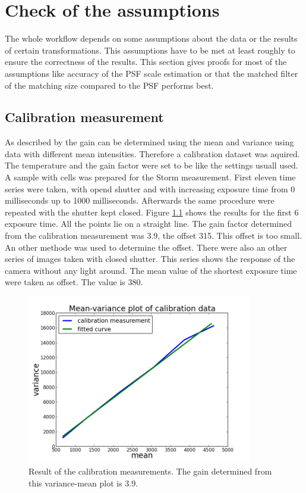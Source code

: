 \chapter{Check of the assumptions}
The whole workflow depends on some assumptions about the data or the results of certain transformations. This assumptions have to be met at least roughly to ensure the correctness of the results.\newline
This section gives proofs for most of the assumptions like accuracy of the PSF scale estimation or that the matched filter of the matching size compared to the PSF performs best.
\section{Calibration measurement}
As described by \cite{meanVar} the gain can be determined using the mean and variance using data with different mean intensities. Therefore a calibration dataset was aquired. The temperature and the gain factor were set to be like the settings usuall used. A sample with cells was prepared for the Storm measurement. First eleven time series were taken, with opend shutter and with increasing exposure time from 0 milliseconds up to 1000 milliseconds. Afterwards the same procedure were repeated with the shutter kept closed. Figure \ref{calibplot} shows the results for the first 6 exposure time. All the points lie on a straight line. The gain factor determined from the calibration measurement was 3.9, the offset 315. This offset is too small. An other methode was used to determine the offset. There were also an other series of  images taken with closed shutter. This series shows the response of the camera without any light around. The mean value of the shortest exposure time were taken as offset. The value is 380. 
\begin{figure}
\centering
\includegraphics[width = 0.88\textwidth]{pictures/meanVariancePlotCalibration.png}
	 \caption{Result of the calibration measurements. The gain determined from this variance-mean plot is 3.9.}
	\label{calibplot}
\end{figure}


